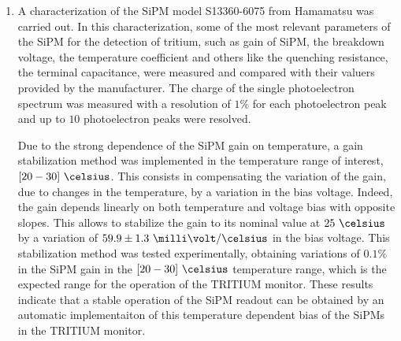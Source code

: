 \begin{enumerate}
\begin{enumerate}
\item{} A characterization of the SiPM model S13360-6075 from Hamamatsu was carried out. In this characterization, some of the most relevant parameters of the SiPM for the detection of tritium, such as gain of SiPM, the breakdown voltage, the temperature coefficient and others like the quenching resistance, the terminal capacitance, were measured and compared with their valuers provided by the manufacturer. The charge of the single photoelectron spectrum was measured with a resolution of $1\%$ for each photoelectron peak and up to $10$ photoelectron peaks were resolved. %


Due to the strong dependence of the SiPM gain on temperature, a gain stabilization method was implemented in the temperature range of interest, $[20-30]~\celsius$. This consists in compensating the variation of the gain, due to changes in the temperature, by a variation in the bias voltage. Indeed, the gain depends linearly on both temperature and voltage bias with opposite slopes. This allows to stabilize the gain to its nominal value at $25~\celsius$ by a variation of $59.9 \pm 1.3 ~\milli\volt/\celsius$ in the bias voltage. This stabilization method was tested experimentally, obtaining variations of $0.1\%$ in the SiPM gain in the $[20-30]~\celsius$ temperature range, which is the expected range for the operation of the TRITIUM monitor. These results indicate that a stable operation of the SiPM readout can be obtained by an automatic implementaiton of this temperature dependent bias of the SiPMs in the TRITIUM monitor.


\end{enumerate}
\end{enumerate}
